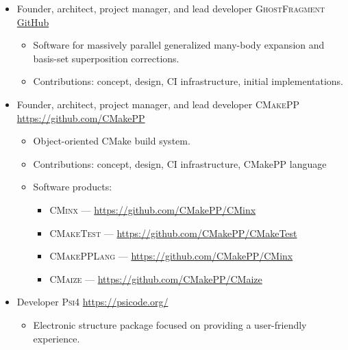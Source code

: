 \documentclass[11pt,a4paper,sans]{moderncv}
\begin{document}
\begin{itemize}
{{\begin{itemize}
{\begin{itemize}
					\item \textsc{WeaklyTypedFloat} -- \url{https://github.com/NWChemEx/WeaklyTypedFloat}
			    	\end{itemize}
	    		}
		\end{itemize}}
	}
	\item{
                 {Founder, architect, project manager, and lead developer}
                 {\textsc{GhostFragment}}
                 {\href{https://github.com/rmrresearch/GhostFragment}{GitHub}}
                 {}
                 {\begin{itemize}
          		\item{Software for massively parallel generalized many-body
          			 expansion and basis-set superposition corrections.}
                		\item{Contributions: concept, design, CI infrastructure, initial implementations.}
                 \end{itemize}}}
	\item{
		{Founder, architect, project manager, and lead developer}
		{\textsc{CMakePP}}
		{\url{https://github.com/CMakePP}}
		{}
		{\begin{itemize}
			\item{Object-oriented CMake build system.}
	 		\item{Contributions: concept, design, CI infrastructure, CMakePP language}
		   	\item{Software products: 
		   		\begin{itemize}
		   	    		\item \textsc{CMinx} ---  \url{https://github.com/CMakePP/CMinx}
		   	    		\item \textsc{CMakeTest} --- \url{https://github.com/CMakePP/CMakeTest}
		   	    		\item \textsc{CMakePPLang} --- \url{https://github.com/CMakePP/CMinx}
		   	    		\item \textsc{CMaize} --- \url{https://github.com/CMakePP/CMaize}
		   	    	\end{itemize}}	                                              
 	       \end{itemize}}}
	\item{
		{Developer}
		{\textsc{Psi4}}
		{\url{https://psicode.org/}}
		{}
		{\begin{itemize}
			\item{Electronic structure package focused on providing a
		  			  user-friendly experience.}

\end{itemize}}}
\end{itemize}
\end{document}
